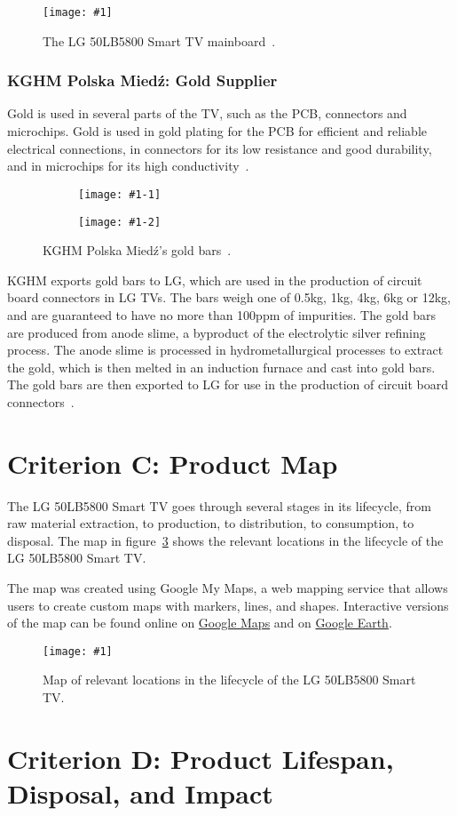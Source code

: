 \documentclass[12pt, letterpaper]{article}
\newcommand{\img}[2]{
  \begin{figure}[H]
    \medskip
    \centering
    \texttt{[image: \#1]}
    \caption{#2}
    \medskip\label{fig:#1}
  \end{figure}
}
\newcommand{\imgs}[2]{
  \begin{figure}[H]
    \medskip
    \begin{subfigure}{.5\textwidth}
      \centering
      \texttt{[image: \#1-1]}
    \end{subfigure}%
    \begin{subfigure}{.5\textwidth}
      \centering
      \texttt{[image: \#1-2]}
    \end{subfigure}
    \caption{#2}
    \medskip\label{fig:#1}
  \end{figure}
}
\begin{document}
\img{EBT62999602}{The LG 50LB5800 Smart TV
mainboard~\autocite{tv-parts-canada-2024}.}

\subsubsection{KGHM Polska Mied\'z: Gold Supplier}

Gold is used in several parts of the TV, such as the PCB, connectors
and microchips. Gold is used in gold plating for the PCB for
efficient and reliable electrical connections, in connectors for its
low resistance and good durability, and in microchips for its high
conductivity~\autocite{elmore-2024}.

\imgs{kghm-gold}{KGHM Polska Mied\'z's gold
bars~\autocite{kghm-polska-miedz-no-dateB}.}

KGHM exports gold bars to LG, which are used in the production of
circuit board connectors in LG TVs. The bars weigh one of 0.5kg, 1kg,
4kg, 6kg or 12kg, and are guaranteed to have no more than 100ppm of
impurities. The gold bars are produced from anode slime, a byproduct
of the electrolytic silver refining process. The anode slime is
processed in hydrometallurgical processes to extract the gold, which
is then melted in an induction furnace and cast into gold bars. The
gold bars are then exported to LG for use in the production of
circuit board connectors~\autocite{kghm-polska-miedz-no-dateB}.

\section{Criterion C: Product Map}

The LG 50LB5800 Smart TV goes through several stages in its lifecycle,
from raw material extraction, to production, to distribution, to
consumption, to disposal. The map in figure~\ref{fig:lg-map} shows the
relevant locations in the lifecycle of the LG 50LB5800 Smart TV.\@

The map was created using Google My Maps, a web mapping service that
allows users to create custom maps with markers, lines, and shapes.
Interactive versions of the map can be found online on
\href{https://www.google.com/maps/d/edit?mid=1_aeai9S8RSvkTi9m7rJfM217r6kOGgc&usp=sharing}{Google
Maps} and on
\href{https://www.google.com/maps/d/earth?mid=1_aeai9S8RSvkTi9m7rJfM217r6kOGgc}{Google
Earth}.

\img{lg-map}{Map of relevant locations in the lifecycle of the LG
50LB5800 Smart TV.}

\section{Criterion D: Product Lifespan, Disposal, and Impact}

\printbibliography[heading=bibintoc,title=References]
\end{document}
